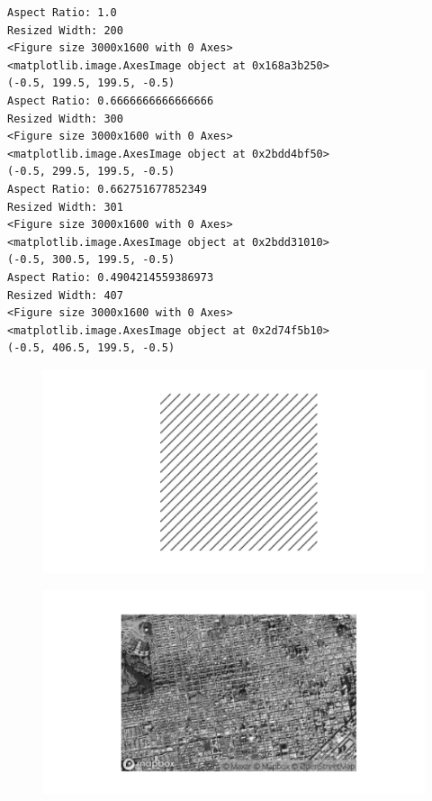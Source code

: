 \documentclass[
  letterpaper,
  DIV=11,
  numbers=noendperiod]{scrreprt}
\begin{document}
\begin{verbatim}
Aspect Ratio: 1.0
Resized Width: 200
<Figure size 3000x1600 with 0 Axes>
<matplotlib.image.AxesImage object at 0x168a3b250>
(-0.5, 199.5, 199.5, -0.5)
Aspect Ratio: 0.6666666666666666
Resized Width: 300
<Figure size 3000x1600 with 0 Axes>
<matplotlib.image.AxesImage object at 0x2bdd4bf50>
(-0.5, 299.5, 199.5, -0.5)
Aspect Ratio: 0.662751677852349
Resized Width: 301
<Figure size 3000x1600 with 0 Axes>
<matplotlib.image.AxesImage object at 0x2bdd31010>
(-0.5, 300.5, 199.5, -0.5)
Aspect Ratio: 0.4904214559386973
Resized Width: 407
<Figure size 3000x1600 with 0 Axes>
<matplotlib.image.AxesImage object at 0x2d74f5b10>
(-0.5, 406.5, 199.5, -0.5)
\end{verbatim}

\begin{figure}[H]

{\centering \includegraphics{results_files/figure-pdf/unnamed-chunk-5-1.pdf}

}

\end{figure}

\begin{figure}[H]

{\centering \includegraphics{results_files/figure-pdf/unnamed-chunk-5-2.pdf}

}

\end{figure}
\end{document}
